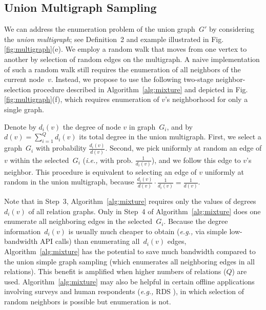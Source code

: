 \documentclass[10pt, conference]{./IEEEtran}
\newcommand{\ie}{{\em i.e., }}
\newcommand{\eg}{{\em e.g., }}
\begin{document}
\subsection{Union Multigraph Sampling}

We can address the enumeration problem of the union graph~$G'$ by considering the \emph{union multigraph}; see Definition~2 and example illustrated in Fig. \ref{fig:multigraph}(e).
We employ a random walk that moves from one vertex to another by selection of random edges on the multigraph.
%
%
%
%
%
%
%
%
%
%
%
%
%
%
%
%
%
A naive implementation of such a random walk still requires the enumeration of all neighbors of the current node~$v$.  Instead, we propose to use the following two-stage neighbor-selection procedure described in Algorithm~\ref{alg:mixture} and depicted in Fig.\ref{fig:multigraph}(f), which requires enumeration of $v$'s neighborhood for only a single graph.

Denote by $d_i(v)$ the degree of node $v$ in graph~$G_i$, and by  $d(v)=\sum_{i=1}^{Q} d_i(v)$ its total degree in the union multigraph.
First, we select a graph~$G_i$ with probability $\frac{d_i(v)}{d(v)}$.
%
Second, we pick uniformly at random an edge of $v$ within the selected~$G_i$ (\ie with prob. $\frac{1}{d_i(v)}$), and we follow this edge to $v$'s neighbor.
This procedure is equivalent to selecting an edge of $v$ uniformly at random in the union multigraph, because  $\frac{d_i(v)}{d(v)} \cdot \frac{1}{d_i(v)} = \frac{1}{d(v)}$.


Note that in Step~3, Algorithm~\ref{alg:mixture} requires only the values of degrees~$d_i(v)$ of all relation graphs.
Only in Step~4 of Algorithm~\ref{alg:mixture} does one enumerate all neighboring edges in the selected~$G_i$.
Because the degree information~$d_i(v)$ is usually much cheaper to obtain (\eg via simple low-bandwidth API calls)
than enumerating all~$d_i(v)$ edges, Algorithm~\ref{alg:mixture} has the potential to save much bandwidth compared to the union simple graph sampling (which enumerates all neighboring edges in all relations).
%
This benefit is amplified when higher numbers of relations ($Q$) are used.
%
Algorithm~\ref{alg:mixture} may also be helpful in certain offline applications involving surveys and human respondents (\eg RDS \cite{Heckathorn02_RDS}), in which selection of random neighbors is possible but enumeration is not.


%

%



\begin{algorithm}[t]
\caption{Multigraph Sampling Algorithm}
\begin{algorithmic}[1]
%
\ENDWHILE
{}
\end{algorithmic}
\label{alg:mixture}
\end{algorithm}
\end{document}
